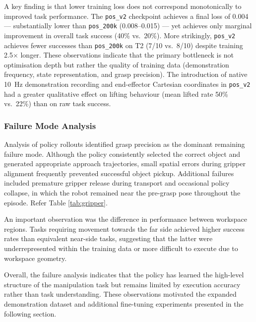 \documentclass[conference, 12pt]{IEEEtran}
\begin{document}
A key finding is that lower training loss does not correspond monotonically to
improved task performance.
The \texttt{pos\_v2} checkpoint achieves a final loss of 0.004 --- substantially
lower than \texttt{pos\_200k} (0.008--0.015) --- yet achieves only marginal
improvement in overall task success (40\% vs.\ 20\%).
More strikingly, \texttt{pos\_v2} achieves fewer successes than
\texttt{pos\_200k} on T2 (7/10 vs.\ 8/10) despite training 2.5$\times$ longer.
These observations indicate that the primary bottleneck is not optimisation
depth but rather the quality of training data (demonstration frequency,
state representation, and grasp precision).
The introduction of native 10~Hz demonstration recording and end-effector
Cartesian coordinates in \texttt{pos\_v2} had a greater qualitative effect
on lifting behaviour (mean lifted rate 50\% vs.\ 22\%) than on raw task success.


\subsubsection{Failure Mode Analysis}

Analysis of policy rollouts identified grasp precision as the dominant remaining failure mode. Although the policy consistently selected the correct object and generated appropriate approach trajectories, small spatial errors during gripper alignment frequently prevented successful object pickup. Additional failures included premature gripper release during transport and occasional policy collapse, in which the robot remained near the pre-grasp pose throughout the episode. Refer Table \ref{tab:gripper}.

An important observation was the difference in performance between workspace regions. Tasks requiring movement towards the far side achieved higher success rates than equivalent near-side tasks, suggesting that the latter were underrepresented within the training data or more difficult to execute due to workspace geometry.

Overall, the failure analysis indicates that the policy has learned the high-level structure of the manipulation task but remains limited by execution accuracy rather than task understanding. These observations motivated the expanded demonstration dataset and additional fine-tuning experiments presented in the following section.

\end{document}
